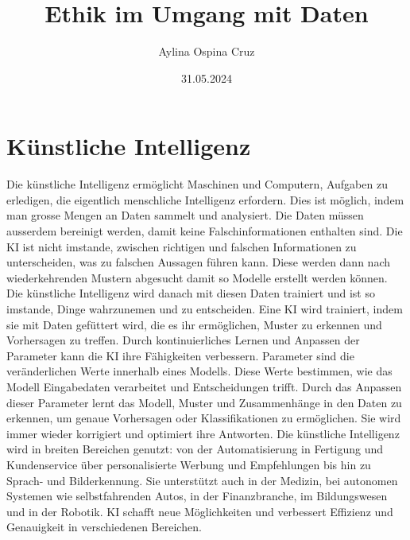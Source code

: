 \documentclass{article}
\title{Ethik im Umgang mit Daten}
\author{Aylina Ospina Cruz}
\date{31.05.2024}
\begin{document}
\maketitle



\tableofcontents


\section{Künstliche Intelligenz}

Die künstliche Intelligenz ermöglicht Maschinen und Computern,  Aufgaben zu erledigen, die eigentlich menschliche Intelligenz erfordern. Dies ist möglich, indem man grosse Mengen an Daten sammelt und analysiert. Die Daten müssen ausserdem bereinigt werden, damit keine Falschinformationen enthalten sind. Die KI ist nicht imstande, zwischen richtigen und falschen Informationen zu unterscheiden, was zu falschen Aussagen führen kann. Diese werden dann nach wiederkehrenden Mustern abgesucht damit so Modelle erstellt werden können. Die künstliche Intelligenz wird danach mit diesen Daten trainiert und ist so imstande, Dinge wahrzunemen und zu entscheiden. Eine KI wird trainiert, indem sie mit Daten gefüttert wird, die es ihr ermöglichen, Muster zu erkennen und Vorhersagen zu treffen. Durch kontinuierliches Lernen und Anpassen der Parameter kann die KI ihre Fähigkeiten verbessern. Parameter sind die veränderlichen Werte innerhalb eines Modells. Diese Werte bestimmen, wie das Modell Eingabedaten verarbeitet und Entscheidungen trifft. Durch das Anpassen dieser Parameter lernt das Modell, Muster und Zusammenhänge in den Daten zu erkennen, um genaue Vorhersagen oder Klassifikationen zu ermöglichen. Sie wird immer wieder korrigiert und optimiert ihre Antworten. Die künstliche Intelligenz wird in breiten Bereichen genutzt: von der Automatisierung in Fertigung und Kundenservice über personalisierte Werbung und Empfehlungen bis hin zu Sprach- und Bilderkennung. Sie unterstützt auch in der Medizin, bei autonomen Systemen wie selbstfahrenden Autos, in der Finanzbranche, im Bildungswesen und in der Robotik. KI schafft neue Möglichkeiten und verbessert Effizienz und Genauigkeit in verschiedenen Bereichen.
\end{document}
